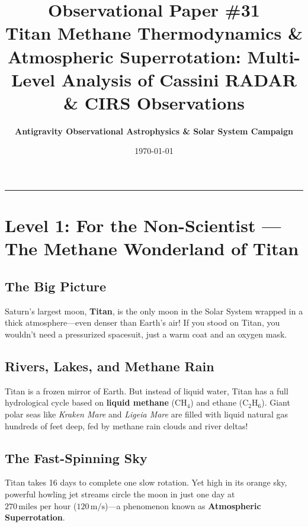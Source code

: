 \documentclass[11pt,a4paper]{article}
\title{\Huge \textbf{Observational Paper \#31}\\ \Large Titan Methane Thermodynamics \& Atmospheric Superrotation: Multi-Level Analysis of Cassini RADAR \& CIRS Observations}
\author{\textbf{Antigravity Observational Astrophysics \& Solar System Campaign}}
\date{\today}
\begin{document}
\maketitle

\vspace{-1em}
\begin{center}
\rule{\textwidth}{1.5pt}
\end{center}

\section*{Level 1: For the Non-Scientist — The Methane Wonderland of Titan}

\subsection*{The Big Picture}
Saturn's largest moon, \textbf{Titan}, is the only moon in the Solar System wrapped in a thick atmosphere—even denser than Earth's air! If you stood on Titan, you wouldn't need a pressurized spacesuit, just a warm coat and an oxygen mask. 

\subsection*{Rivers, Lakes, and Methane Rain}
Titan is a frozen mirror of Earth. But instead of liquid water, Titan has a full hydrological cycle based on \textbf{liquid methane} ($\mathrm{CH_4}$) and ethane ($\mathrm{C_2H_6}$). Giant polar seas like \textit{Kraken Mare} and \textit{Ligeia Mare} are filled with liquid natural gas hundreds of feet deep, fed by methane rain clouds and river deltas!

\subsection*{The Fast-Spinning Sky}
Titan takes 16 days to complete one slow rotation. Yet high in its orange sky, powerful howling jet streams circle the moon in just one day at $270\,\text{miles per hour}$ ($120\,\text{m/s}$)—a phenomenon known as \textbf{Atmospheric Superrotation}.

\newpage

\end{document}
